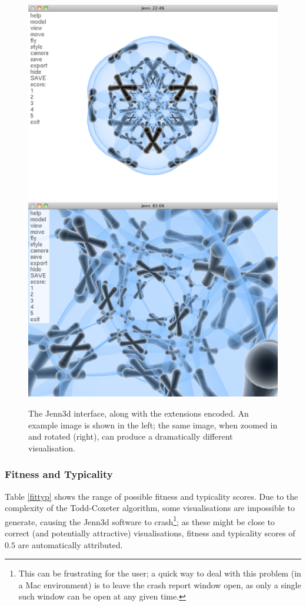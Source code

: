 \documentclass{article}
\begin{document}
\begin{figure}[ht]
	\begin{center}
		\includegraphics[width = .48\textwidth]{jennInterface1}
		\includegraphics[width = .48\textwidth]{jennInterface2}
	\end{center}
	\caption{The Jenn3d interface, along with the extensions encoded. An
	example image is shown in the left; the same image, when zoomed in
	and rotated (right), can produce a dramatically different
	visualisation.}
	\label{interface}
\end{figure}

\subsubsection{Fitness and Typicality}

Table \ref{fittyp} shows the range of possible fitness and typicality scores.
Due to the complexity of the Todd-Coxeter algorithm, some visualisations are
impossible to generate, causing the Jenn3d software to crash\footnote{This can
be frustrating for the user; a quick way to deal with this problem (in a Mac
environment) is to leave the crash report window open, as only a single such
window can be open at any given time.}; as these might be close to correct (and
potentially attractive) visualisations, fitness and typicality scores of $0.5$
are automatically attributed.
\end{document}
